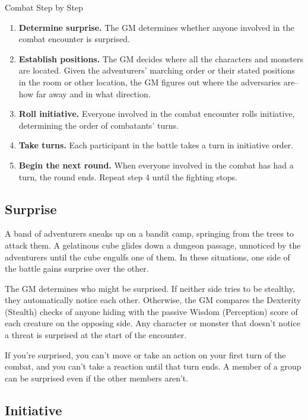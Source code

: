 \begin{DndComment}{Combat Step by Step\label{cmt:combat-step-by-step}}
    \begin{enumerate}
        \item \textbf{Determine surprise.} The GM determines whether anyone involved in the combat encounter is surprised.
        \item \textbf{Establish positions.} The GM decides where all the characters and monsters are located. Given the adventurers' marching order or their stated positions in the room or other location, the GM figures out where the adversaries are--how far away and in what direction.
        \item \textbf{Roll initiative.} Everyone involved in the combat encounter rolls initiative, determining the order of combatants' turns.
        \item \textbf{Take turns.} Each participant in the battle takes a turn in initiative order.
        \item \textbf{Begin the next round.} When everyone involved in the combat has had a turn, the round ends. Repeat step 4 until the fighting stops.
    \end{enumerate}
\end{DndComment}


\subsection{Surprise}

A band of adventurers sneaks up on a bandit camp, springing from the trees to attack them. A gelatinous cube glides down a dungeon passage, unnoticed by the adventurers until the cube engulfs one of them. In these situations, one side of the battle gains surprise over the other.

The GM determines who might be surprised. If neither side tries to be stealthy, they automatically notice each other. Otherwise, the GM compares the Dexterity (Stealth) checks of anyone hiding with the passive Wisdom (Perception) score of each creature on the opposing side. Any character or monster that doesn't notice a threat is surprised at the start of the encounter.

If you're surprised, you can't move or take an action on your first turn of the combat, and you can't take a reaction until that turn ends. A member of a group can be surprised even if the other members aren't.

\subsection{Initiative}

